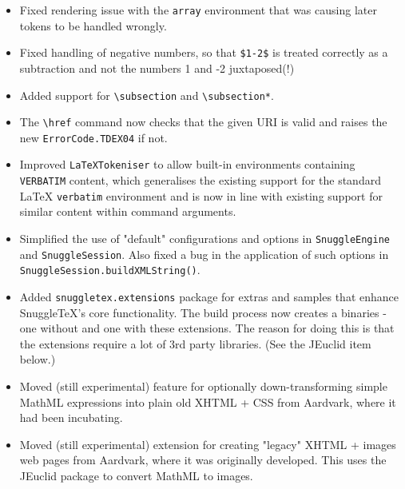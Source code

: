 \begin{itemize}

  \item Fixed rendering issue with the \verb|array| environment that was
  causing later tokens to be handled wrongly.

  \item Fixed handling of negative numbers, so that \verb|$1-2$| is treated
  correctly as a subtraction and not the numbers 1 and -2 juxtaposed(!)

  \item Added support for \verb|\subsection| and \verb|\subsection*|.

  \item The \verb|\href| command now checks that the given URI is valid and
  raises the new \verb|ErrorCode.TDEX04| if not.

  \item Improved \verb|LaTeXTokeniser| to allow built-in environments
  containing \verb|VERBATIM| content, which generalises the existing support
  for the standard LaTeX \verb|verbatim| environment and is now in line with
  existing support for similar content within command arguments.

  \item Simplified the use of "default" configurations and options in
  \verb|SnuggleEngine| and \verb|SnuggleSession|. Also fixed a bug in the
  application of such options in \verb|SnuggleSession.buildXMLString()|.

  \item Added \verb|snuggletex.extensions| package for extras and samples
  that enhance SnuggleTeX's core functionality. The build process now creates
  a binaries - one without and one with these extensions. The reason for doing
  this is that the extensions require a lot of 3rd party libraries. (See the
  JEuclid item below.)

  \item Moved (still experimental) feature for optionally down-transforming
  simple MathML expressions into plain old XHTML + CSS from Aardvark, where it
  had been incubating.

  \item Moved (still experimental) extension for creating "legacy" XHTML +
  images web pages from Aardvark, where it was originally developed. This uses
  the JEuclid package to convert MathML to images.


\end{itemize}
